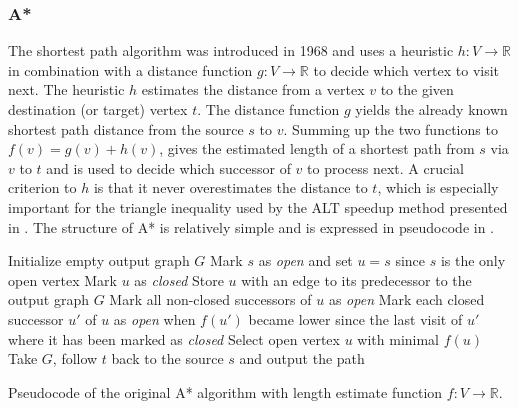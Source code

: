 		\subsubsection{A*}
		\label{subsubsec:astar}
		
			The  shortest path algorithm was introduced in 1968 and uses a heuristic $h : V \rightarrow \mathbb{R}$ in combination with a distance function $g : V \rightarrow \mathbb{R}$ to decide which vertex to visit next\cite{astar}.
			The heuristic $h$ estimates the distance from a vertex $v$ to the given destination (or target) vertex $t$.
			The distance function $g$ yields the already known shortest path distance from the source $s$ to $v$.
			Summing up the two functions to $f(v) = g(v) + h(v)$, gives the estimated length of a shortest path from $s$ via $v$ to $t$ and is used to decide which successor of $v$ to process next.
			A crucial criterion to $h$ is that it never overestimates the distance to $t$, which is especially important for the triangle inequality used by the ALT speedup method presented in .
			The structure of A* is relatively simple and is expressed in pseudocode in .
			
			\begin{algorithm}[h]
				\begin{algorithmic}[1]
					\State Initialize empty output graph $G$
					\State Mark $s$ as \emph{open} and set $u = s$ since $s$ is the only open vertex
						\State Mark $u$ as \emph{closed}
						\State Store $u$ with an edge to its predecessor to the output graph $G$
						\State Mark all non-closed successors of $u$ as \emph{open} \label{alg:astar-open-1}
						\State Mark each closed successor $u'$ of $u$ as \emph{open} when $f(u')$ became lower since the last visit of $u'$ where it has been marked as \emph{closed} \label{alg:astar-open-2}
						\State Select open vertex $u$ with minimal $f(u)$
					\EndWhile
					\State Take $G$, follow $t$ back to the source $s$ and output the path
				\end{algorithmic}
				\caption{Pseudocode of the original A* algorithm\cite{astar} with length estimate function $f:V\rightarrow\mathbb{R}$.}
				\label{alg:astar}
			\end{algorithm}
			
